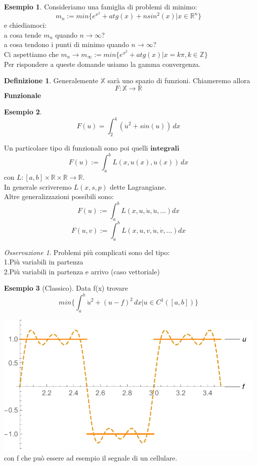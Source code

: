 \documentclass[a4paper]{book}
\theoremstyle{definition}
\newtheorem{ex}{Esempio}
\newtheorem{defn}{Definizione}
\theoremstyle{remark}
\newtheorem{oss}{Osservazione}
\theoremstyle{definition}
\newcommand{\bbx}{\mathbb{X}}
\newcommand{\bbr}{\mathbb{R}}
\begin{document}
\begin{ex}
Consideriamo una famiglia di problemi di minimo:
\[
	m_n := min\{e^{x^2} + atg(x) + nsin^2(x)|x \in \bbr^n \}
\]
e chiediamoci:\\
a cosa tende $m_n$ quando $n \to\infty$?\\
a cosa tendono i punti di minimo quando $n \to\infty$?\\
Ci aspettiamo che $m_n \to m_{\infty} := min\{e^{x^2} + atg(x) | x = k\pi, k \in \mathbb{Z} \}$\\
Per rispondere a queste domande usiamo la gamma convergenza.
\end{ex}

\begin{defn}
Generalemente $\bbx$ sarà uno spazio di funzioni. Chiameremo allora 
\[
 	F :\bbx \to \bbr 
 \] 
\textbf{Funzionale}
\end{defn}

\begin{ex}
\[
	F(u) = \int_2^4 (\dot u^2 + sin(u))\,dx
\]
\end{ex}
\noindent
Un particolare tipo di funzionali sono poi quelli $\textbf{integrali}$
\[
	F(u) := \int_a^b L(x, u(x), \dot u(x))\,dx
\]
con $L: [a,b]\times\bbr\times\bbr \to \bbr$.\\
In generale scriveremo $L(x, s, p)$ dette Lagrangiane.\\
Altre generalizzazioni possibili sono:
\[
	F(u) := \int_{a}^{b} L(x, u, \dot u, \ddot u, \dots)dx
\]
\[
	F(u, v) := \int_a^b L(x, u, v, \dot u, \dot v, \dots)dx
\]

\begin{oss}
Problemi più complicati sono del tipo:\\
1.Più variabili in partenza\\
2.Più variabili in partenza e arrivo (caso vettoriale)
\end{oss}

\begin{ex}[Classico]
Data f(x) trovare\\
\[
	min\{\int_a^b \dot u^2 + (u - f)^2\,dx | u \in C^1([a,b])\}
\]

\includegraphics[scale = 0.5]{Fourier_onda_quadra.pdf}\\
\noindent
con f che può essere ad esempio il segnale di un cellulare.
\end{ex}
\end{document}
